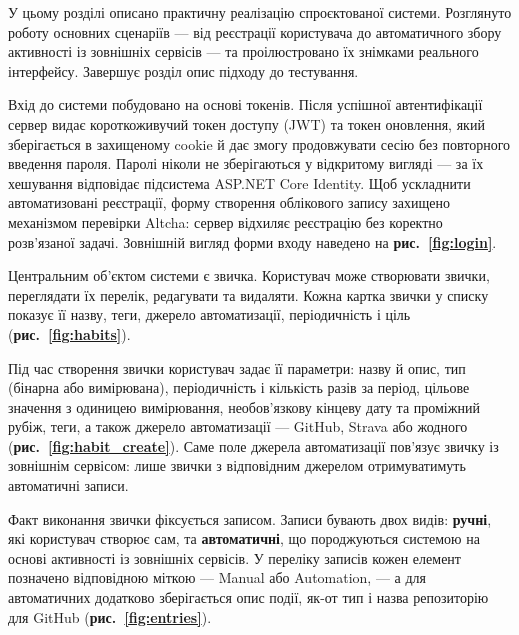 
У цьому розділі описано практичну реалізацію спроєктованої системи. Розглянуто роботу основних сценаріїв — від реєстрації користувача до автоматичного збору активності із зовнішніх сервісів — та проілюстровано їх знімками реального інтерфейсу. Завершує розділ опис підходу до тестування.


Вхід до системи побудовано на основі токенів. Після успішної автентифікації сервер видає короткоживучий токен доступу (JWT) та токен оновлення, який зберігається в захищеному cookie й дає змогу продовжувати сесію без повторного введення пароля. Паролі ніколи не зберігаються у відкритому вигляді — за їх хешування відповідає підсистема ASP.NET Core Identity. Щоб ускладнити автоматизовані реєстрації, форму створення облікового запису захищено механізмом перевірки Altcha: сервер відхиляє реєстрацію без коректно розв'язаної задачі. Зовнішній вигляд форми входу наведено на \textbf{рис.~\ref{fig:login}}.



Центральним об'єктом системи є звичка. Користувач може створювати звички, переглядати їх перелік, редагувати та видаляти. Кожна картка звички у списку показує її назву, теги, джерело автоматизації, періодичність і ціль (\textbf{рис.~\ref{fig:habits}}).


Під час створення звички користувач задає її параметри: назву й опис, тип (бінарна або вимірювана), періодичність і кількість разів за період, цільове значення з одиницею вимірювання, необов'язкову кінцеву дату та проміжний рубіж, теги, а також джерело автоматизації — GitHub, Strava або жодного (\textbf{рис.~\ref{fig:habit_create}}). Саме поле джерела автоматизації пов'язує звичку із зовнішнім сервісом: лише звички з відповідним джерелом отримуватимуть автоматичні записи.


Факт виконання звички фіксується записом. Записи бувають двох видів: \textbf{ручні}, які користувач створює сам, та \textbf{автоматичні}, що породжуються системою на основі активності із зовнішніх сервісів. У переліку записів кожен елемент позначено відповідною міткою — Manual або Automation, — а для автоматичних додатково зберігається опис події, як-от тип і назва репозиторію для GitHub (\textbf{рис.~\ref{fig:entries}}).

